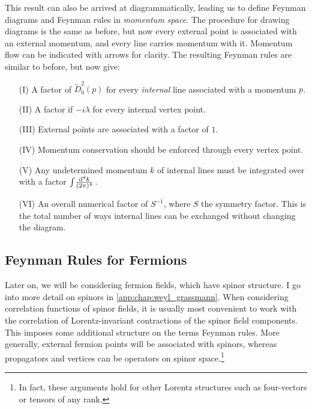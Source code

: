 \documentclass[../main.tex]{subfiles}
\begin{document}
This result can also be arrived at diagrammatically, leading us to define Feynman diagrams and Feynman rules in \emph{momentum space}.
The procedure for drawing diagrams is the same as before, but now every external point is associated with an external momentum, and every line carries momentum with it.
Momentum flow can be indicated with arrows for clarity.
The resulting Feynman rules are similar to before, but now give:
\begin{itemize}
  \item [(I)] A factor of \(\tilde{D}_0^2(p)\) for every \emph{internal} line associated with a momentum \(p\).
  \item [(II)] A factor if \(-i\lambda\) for every internal vertex point.
  \item [(III)] External points are associated with a factor of \(1\).
  \item [(IV)] Momentum conservation should be enforced through every vertex point.
  \item [(V)] Any undetermined momentum \(k\) of internal lines must be integrated over with a factor \(\int\!\frac{\mathrm{d}^{4}k}{(2\pi)^{4}}\,\).
  \item [(VI)] An overall numerical factor of \(S^{-1}\), where \(S\) the symmetry factor. This is the total number of ways internal lines can be exchanged without changing the diagram.
\end{itemize}


\subsection{Feynman Rules for Fermions}
Later on, we will be considering fermion fields, which have spinor structure.
I go into more detail on spinors in \cref{app:chap:weyl_grassmann}.
When considering correlation functions of spinor fields, it is usually most convenient to work with the correlation of Lorentz-invariant contractions of the spinor field components.
This imposes some additional structure on the terms Feynman rules.
More generally, external fermion points will be associated with spinors, whereas propagators and vertices can be operators on spinor space.\footnote{In fact, these arguments hold for other Lorentz structures such as four-vectors or tensors of any rank.}
\end{document}
